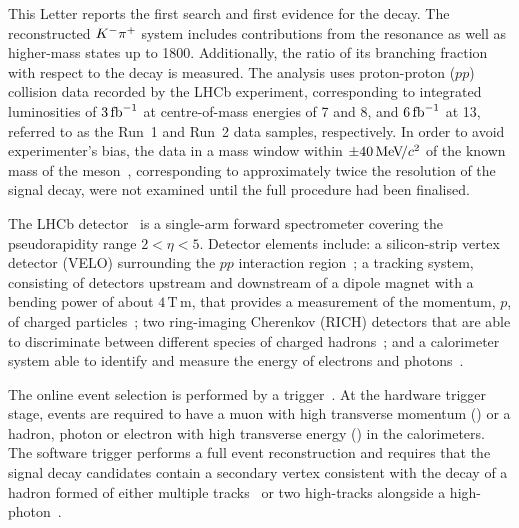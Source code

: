 This Letter reports the first search and first evidence for the \bskpig decay.
The reconstructed ${{K}^-}{{\pi}^+}$ system includes contributions from the \Kstarzbv resonance as well as higher-mass states up to 1800\mevcc.
Additionally, the ratio of its branching fraction with respect to the \bdkpig decay is measured.
The analysis uses proton-proton ($pp$) collision data recorded by the LHCb experiment, corresponding to integrated luminosities of $3\text{\,fb}^{-1}$ at centre-of-mass energies of 7 and 8\tev, and $6\text{\,fb}^{-1}$ at 13\tev, referred to as the {Run~1} and {Run~2} data samples, respectively.
In order to avoid experimenter's bias, the data in a mass window within $\pm 40\text{\,Me\kern -0.1em V\!/}c^2$ of the known mass of the \Bs meson~\cite{PDG2024}, corresponding to approximately twice the resolution of the signal decay, were not examined until the full procedure had been finalised.

The LHCb detector~\cite{LHCb-DP-2008-001,LHCb-DP-2014-002} is a single-arm forward spectrometer covering the pseudorapidity range $2 < \eta < 5$.
Detector elements include: a silicon-strip vertex detector (VELO) surrounding the $pp$ interaction region~\cite{LHCb-DP-2014-001}; a tracking system, consisting of detectors upstream and downstream of a dipole magnet with a bending power of about $4{\mathrm{\,T\,m}}$, that provides a measurement of the momentum, $p$, of charged particles~\cite{LHCb-DP-2013-003,LHCb-DP-2017-001}; two ring-imaging Cherenkov (RICH) detectors that are able to discriminate between different species of charged hadrons~\cite{LHCb-DP-2012-003}; and a calorimeter system able to identify and measure the energy of electrons and photons~\cite{LHCb-DP-2020-001}.

The online event selection is performed by a trigger~\cite{LHCb-DP-2012-004,LHCb-DP-2019-001}.
At the hardware trigger stage, events are required to have a muon with high transverse momentum (\pt) or a hadron, photon or electron with high transverse energy (\et) in the calorimeters.
The software trigger performs a full event reconstruction and requires that the signal decay candidates contain a secondary vertex consistent with the decay of a \bquark hadron formed of either multiple tracks~\cite{BBDT,LHCb-PROC-2015-018} or two high-\pt tracks alongside a high-\et photon~\cite{LHCb-PUB-2012-002}.

